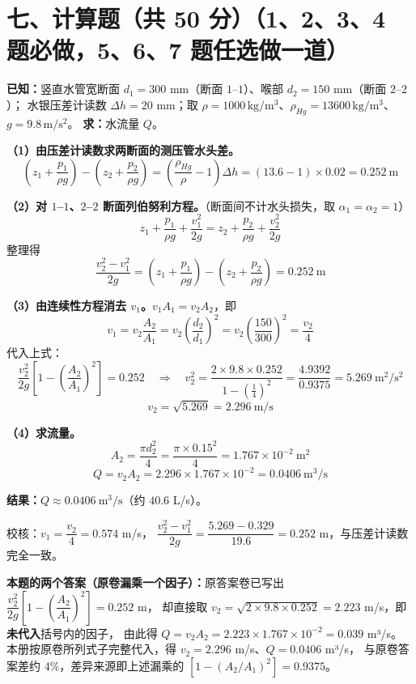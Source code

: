 \section{七、计算题（共 50 分）（1、2、3、4 题必做，5、6、7 题任选做一道）}


\begin{jie}
\textbf{已知：}竖直水管宽断面 $d_1=300$ mm（断面 $1$--$1$）、喉部 $d_2=150$ mm（断面 $2$--$2$）；
水银压差计读数 $\Delta h=20$ mm；取 $\rho=1000\,\mathrm{kg/m^{3}}$、$\rho_{Hg}=13600\,\mathrm{kg/m^{3}}$、
$g=9.8\,\mathrm{m/s^{2}}$。
\textbf{求：}水流量 $Q$。

\textbf{（1）由压差计读数求两断面的测压管水头差。}
\[
\left(z_1+\frac{p_1}{\rho g}\right)-\left(z_2+\frac{p_2}{\rho g}\right)
=\left(\frac{\rho_{Hg}}{\rho}-1\right)\Delta h
=(13.6-1)\times0.02=0.252\ \mathrm{m}
\]

\textbf{（2）对 $1$--$1$、$2$--$2$ 断面列伯努利方程。}（断面间不计水头损失，取 $\alpha_1=\alpha_2=1$）
\[
z_1+\frac{p_1}{\rho g}+\frac{v_1^{2}}{2g}=z_2+\frac{p_2}{\rho g}+\frac{v_2^{2}}{2g}
\]
整理得
\[
\frac{v_2^{2}-v_1^{2}}{2g}
=\left(z_1+\frac{p_1}{\rho g}\right)-\left(z_2+\frac{p_2}{\rho g}\right)=0.252\ \mathrm{m}
\]

\textbf{（3）由连续性方程消去 $v_1$。}$v_1A_1=v_2A_2$，即
\[
v_1=v_2\frac{A_2}{A_1}=v_2\left(\frac{d_2}{d_1}\right)^{2}=v_2\left(\frac{150}{300}\right)^{2}=\frac{v_2}{4}
\]
代入上式：
\[
\frac{v_2^{2}}{2g}\left[1-\left(\frac{A_2}{A_1}\right)^{2}\right]=0.252
\quad\Longrightarrow\quad
v_2^{2}=\frac{2\times9.8\times0.252}{1-\left(\frac{1}{4}\right)^{2}}
=\frac{4.9392}{0.9375}=5.269\ \mathrm{m^{2}/s^{2}}
\]
\[
v_2=\sqrt{5.269}=2.296\ \mathrm{m/s}
\]

\textbf{（4）求流量。}
\[
A_2=\frac{\pi d_2^{2}}{4}=\frac{\pi\times0.15^{2}}{4}=1.767\times10^{-2}\ \mathrm{m^{2}}
\]
\[
Q=v_2A_2=2.296\times1.767\times10^{-2}=0.0406\ \mathrm{m^{3}/s}
\]

\textbf{结果：}$\boxed{Q\approx0.0406\ \mathrm{m^{3}/s}}$（约 $40.6$ L/s）。

校核：$v_1=\dfrac{v_2}{4}=0.574$ m/s，
$\dfrac{v_2^{2}-v_1^{2}}{2g}=\dfrac{5.269-0.329}{19.6}=0.252$ m，与压差计读数完全一致。
\end{jie}

\begin{tishi}
\textbf{本题的两个答案（原卷漏乘一个因子）：}原答案卷已写出
$\dfrac{v_2^{2}}{2g}\left[1-\left(\dfrac{A_2}{A_1}\right)^{2}\right]=0.252$ m，
却直接取 $v_2=\sqrt{2\times9.8\times0.252}=2.223$ m/s，即\textbf{未代入}括号内的因子，
由此得 $Q=v_2A_2=2.223\times1.767\times10^{-2}=0.039$ m³/s。
本册按原卷所列式子完整代入，得 $v_2=2.296$ m/s、$Q=0.0406$ m³/s，
与原卷答案差约 $4\%$，差异来源即上述漏乘的 $\left[1-\left(A_2/A_1\right)^{2}\right]=0.9375$。
\end{tishi}

